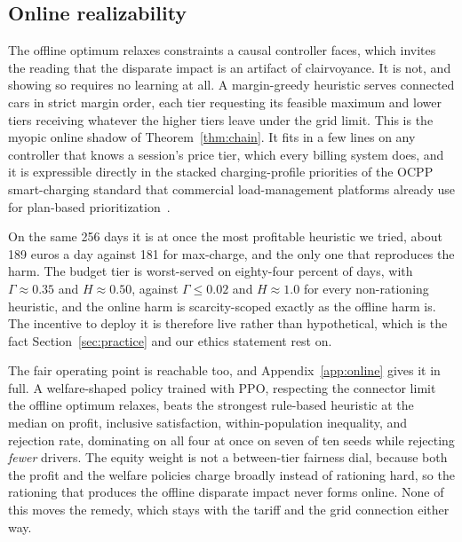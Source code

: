 \documentclass[manuscript, screen, review, anonymous]{acmart}
\begin{document}
\subsection{Online realizability}
\label{sec:online-brief}

The offline optimum relaxes constraints a causal controller faces, which invites the reading that the disparate impact is an artifact of clairvoyance. It is not, and showing so requires no learning at all. A margin-greedy heuristic serves connected cars in strict margin order, each tier requesting its feasible maximum and lower tiers receiving whatever the higher tiers leave under the grid limit. This is the myopic online shadow of Theorem~\ref{thm:chain}. It fits in a few lines on any controller that knows a session's price tier, which every billing system does, and it is expressible directly in the stacked charging-profile priorities of the OCPP smart-charging standard that commercial load-management platforms already use for plan-based prioritization~\cite{ocpp201,ampeco2026}.

On the same 256 days it is at once the most profitable heuristic we tried, about 189 euros a day against 181 for max-charge, and the only one that reproduces the harm. The budget tier is worst-served on eighty-four percent of days, with $\Gamma\approx 0.35$ and $H\approx 0.50$, against $\Gamma\le 0.02$ and $H\approx 1.0$ for every non-rationing heuristic, and the online harm is scarcity-scoped exactly as the offline harm is. The incentive to deploy it is therefore live rather than hypothetical, which is the fact Section~\ref{sec:practice} and our ethics statement rest on.

The fair operating point is reachable too, and Appendix~\ref{app:online} gives it in full. A welfare-shaped policy trained with PPO, respecting the connector limit the offline optimum relaxes, beats the strongest rule-based heuristic at the median on profit, inclusive satisfaction, within-population inequality, and rejection rate, dominating on all four at once on seven of ten seeds while rejecting \emph{fewer} drivers. The equity weight is not a between-tier fairness dial, because both the profit and the welfare policies charge broadly instead of rationing hard, so the rationing that produces the offline disparate impact never forms online. 
None of this moves the remedy, which stays with the tariff and the grid connection either way.

\end{document}
